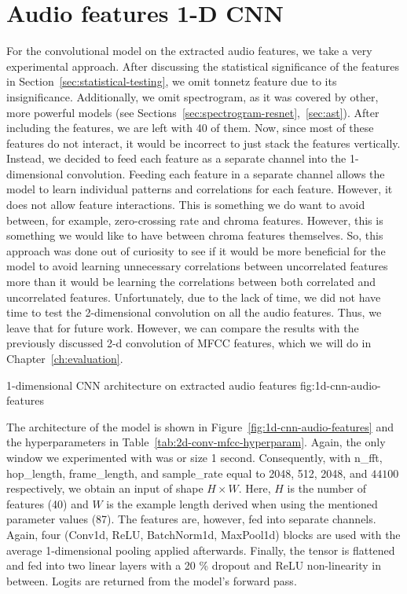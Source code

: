 \section{Audio features 1-D CNN}
\label{sec:audio-features-1d-cnn}
For the convolutional model on the extracted audio features, we take a very experimental approach. After discussing the statistical significance of the features in Section~\ref{sec:statistical-testing}, we omit tonnetz feature due to its insignificance. Additionally, we omit spectrogram, as it was covered by other, more powerful models (see Sections~\ref{sec:spectrogram-resnet},~\ref{sec:ast}). After including the features, we are left with 40 of them. Now, since most of these features do not interact, it would be incorrect to just stack the features vertically. Instead, we decided to feed each feature as a separate channel into the 1-dimensional convolution. Feeding each feature in a separate channel allows the model to learn individual patterns and correlations for each feature. However, it does not allow feature interactions. This is something we do want to avoid between, for example, zero-crossing rate and chroma features. However, this is something we would like to have between chroma features themselves. So, this approach was done out of curiosity to see if it would be more beneficial for the model to avoid learning unnecessary correlations between uncorrelated features more than it would be learning the correlations between both correlated and uncorrelated features. Unfortunately, due to the lack of time, we did not have time to test the 2-dimensional convolution on all the audio features. Thus, we leave that for future work. However, we can compare the results with the previously discussed 2-d convolution of MFCC features, which we will do in Chapter~\ref{ch:evaluation}.

	        {1-dimensional CNN architecture on extracted audio features}
                {fig:1d-cnn-audio-features}

The architecture of the model is shown in Figure~\ref{fig:1d-cnn-audio-features} and the hyperparameters in Table~\ref{tab:2d-conv-mfcc-hyperparam}. Again, the only window we experimented with was or size 1 second. Consequently, with n\_fft, hop\_length, frame\_length, and sample\_rate equal to 2048, 512, 2048, and $44100$ respectively, we obtain an input of shape $H \times W$. Here, $H$ is the number of features (40) and $W$ is the example length derived when using the mentioned parameter values (87). The features are, however, fed into separate channels. Again, four (Conv1d, ReLU, BatchNorm1d, MaxPool1d) blocks are used with the average 1-dimensional pooling applied afterwards. Finally, the tensor is flattened and fed into two linear layers with a 20 \% dropout and ReLU non-linearity in between. Logits are returned from the model's forward pass. 

